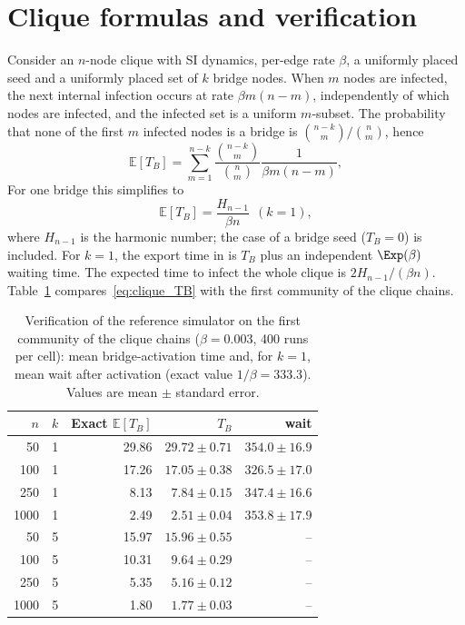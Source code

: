 \appendices

\section{Clique formulas and verification}
\label{app:clique}

Consider an $n$-node clique with SI dynamics, per-edge rate $\beta$, a uniformly placed seed and a uniformly placed set of $k$ bridge nodes. When $m$ nodes are infected, the next internal infection occurs at rate $\beta m(n-m)$, independently of which nodes are infected, and the infected set is a uniform $m$-subset. The probability that none of the first $m$ infected nodes is a bridge is $\binom{n-k}{m}/\binom{n}{m}$, hence
\begin{equation}
\label{eq:clique_TB}
\mathbb{E}[T_B]=\sum_{m=1}^{n-k}\frac{\binom{n-k}{m}}{\binom{n}{m}}\frac{1}{\beta m(n-m)},
\end{equation}
For one bridge this simplifies to
\begin{equation}
\mathbb{E}[T_B]=\frac{H_{n-1}}{\beta n}\ \ (k=1),
\end{equation}
where $H_{n-1}$ is the harmonic number; the case of a bridge seed ($T_B=0$) is included. For $k=1$, the export time in \Full{} is $T_B$ plus an independent $\Exp(\beta)$ waiting time. The expected time to infect the whole clique is $2H_{n-1}/(\beta n)$. Table~\ref{tab:verification} compares~\eqref{eq:clique_TB} with the first community of the clique chains.

\begin{table}[!htbp]
\centering
\caption{Verification of the reference simulator on the first community of the clique chains ($\beta=0.003$, 400 runs per cell): mean bridge-activation time and, for $k=1$, mean wait after activation (exact value $1/\beta=333.3$). Values are mean $\pm$ standard error.}
\label{tab:verification}
\small
\setlength{\tabcolsep}{3pt}
\begin{tabular}{rrrrr}
\toprule
$n$ & $k$ & Exact $\mathbb{E}[T_B]$ & \Full{} $T_B$ & \Full{} wait\\
\midrule
50 & 1 & 29.86 & $29.72\pm0.71$ & $354.0\pm16.9$\\
100 & 1 & 17.26 & $17.05\pm0.38$ & $326.5\pm17.0$\\
250 & 1 & 8.13 & $7.84\pm0.15$ & $347.4\pm16.6$\\
1000 & 1 & 2.49 & $2.51\pm0.04$ & $353.8\pm17.9$\\
50 & 5 & 15.97 & $15.96\pm0.55$ & --\\
100 & 5 & 10.31 & $9.64\pm0.29$ & --\\
250 & 5 & 5.35 & $5.16\pm0.12$ & --\\
1000 & 5 & 1.80 & $1.77\pm0.03$ & --\\
\bottomrule
\end{tabular}
\end{table}

